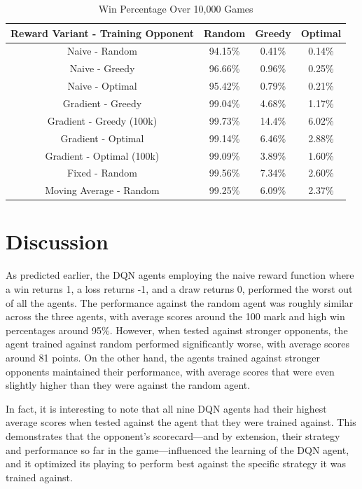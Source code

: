 \documentclass[12pt]{article}
\begin{document}
\begin{table}[H]
    \centering
    \caption*{Win Percentage Over 10,000 Games}
    \begin{tabular}{ |c|c|c|c| }
        \hline
        Reward Variant - Training Opponent & Random & Greedy & Optimal \\
        \hline
        Naive - Random & 94.15\% & 0.41\% & 0.14\% \\
        Naive - Greedy & 96.66\% & 0.96\% & 0.25\% \\
        Naive - Optimal & 95.42\% & 0.79\% & 0.21\% \\
        Gradient - Greedy & 99.04\% & 4.68\% & 1.17\% \\
        Gradient - Greedy (100k) & 99.73\% & 14.4\% & 6.02\% \\
        Gradient - Optimal & 99.14\% & 6.46\% & 2.88\% \\
        Gradient - Optimal (100k) & 99.09\% & 3.89\% & 1.60\% \\
        Fixed - Random & 99.56\% & 7.34\% & 2.60\% \\
        Moving Average - Random & 99.25\% & 6.09\% & 2.37\% \\
        \hline
    \end{tabular}
\end{table}

\section{Discussion}
As predicted earlier, the DQN agents employing the naive reward function where a win returns 1, a loss returns -1, and a draw returns 0, performed the worst out of all the agents. The performance against the random agent was roughly similar across the three agents, with average scores around the 100 mark and high win percentages around 95\%. However, when tested against stronger opponents, the agent trained against random performed significantly worse, with average scores around 81 points. On the other hand, the agents trained against stronger opponents maintained their performance, with average scores that were even slightly higher than they were against the random agent.

In fact, it is interesting to note that all nine DQN agents had their highest average scores when tested against the agent that they were trained against. This demonstrates that the opponent's scorecard—and by extension, their strategy and performance so far in the game—influenced the learning of the DQN agent, and it optimized its playing to perform best against the specific strategy it was trained against.
\end{document}
